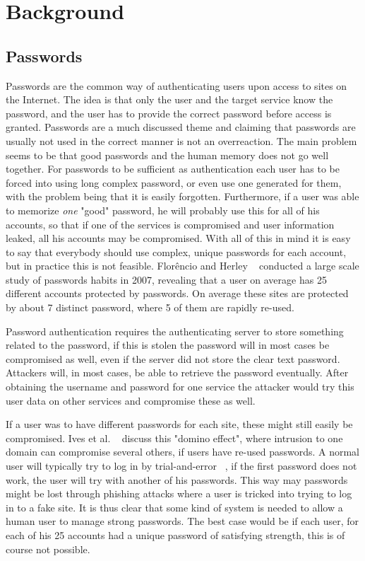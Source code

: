 \chapter{Background}\label{chp:background}


\section{Passwords}
Passwords are the common way of authenticating users upon access to sites on the Internet. The idea is that only the user and the target service know the password, and the user has to provide the correct password before access is granted. Passwords are a much discussed theme and claiming that passwords are usually not used in the correct manner is not an overreaction. The main problem seems to be that good passwords and the human memory does not go well together. For passwords to be sufficient as authentication each user has to be forced into using long complex password, or even use one generated for them, with the problem being that it is easily forgotten. Furthermore, if a user was able to memorize \emph{one} "good" password, he will probably use this for all of his accounts, so that if one of the services is compromised and user information leaked, all his accounts may be compromised. With all of this in mind it is easy to say that everybody should use complex, unique passwords for each account, but in practice this is not feasible. Florêncio and Herley ~\cite{password-habits} conducted a large scale study of passwords habits in 2007, revealing that a user on average has 25 different accounts protected by passwords. On average these sites are protected by about 7 distinct password, where 5 of them are rapidly re-used.
\par Password authentication requires the authenticating server to store something related to the password, if this is stolen the password will in most cases be compromised as well, even if the server did not store the clear text password. Attackers will, in most cases, be able to retrieve the password eventually. After obtaining the username and password for one service the attacker would try this user data on other services and compromise these as well. 
\par If a user was to have different passwords for each site, these might still easily be compromised. Ives et al. ~\cite{domino-effect} discuss this "domino effect", where intrusion to one domain can compromise several others, if users have re-used passwords.  A normal user will typically try to log in by trial-and-error ~\cite{single-pw-auth}, if the first password does not work, the user will try with another of his passwords. This way may passwords might be lost through phishing attacks where a user is tricked into trying to log in to a fake site. It is thus clear that some kind of system is needed to allow a human user to manage strong passwords. The best case would be if each user, for each of his 25 accounts had a unique password of satisfying strength, this is of course not possible.

